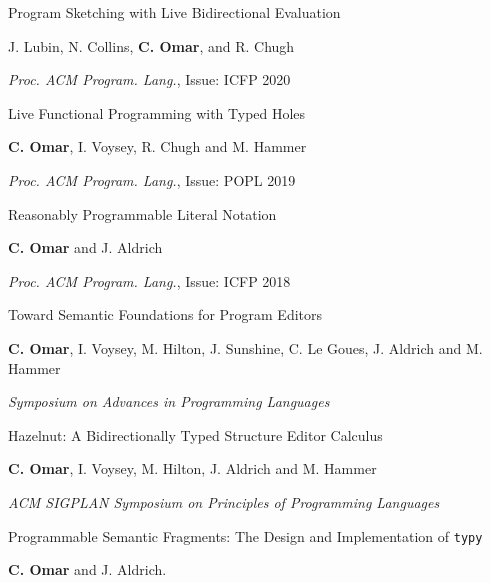 \documentclass[10pt,letterpaper]{article}
\renewenvironment{itemize}{
  \begin{list}{}{
    \setlength{\leftmargin}{1.25em}
    \setlength{\itemsep}{0.25em}
    \setlength{\parskip}{0pt}
    \setlength{\parsep}{0.2em}
  }
}{
  \end{list}
}
\begin{document}
\begin{enumerate}[leftmargin=*, labelindent=6.5em, font=\bfseries]
\begin{itemize}
        \end{itemize}
  \item[ICFP 2020] {Program Sketching with Live Bidirectional Evaluation}
        \begin{itemize}
          \item J. Lubin, N. Collins, \textbf{C. Omar}, and R. Chugh
          \item \textit{Proc. ACM Program. Lang.}, Issue: ICFP 2020
        \end{itemize}
  \item[POPL 2019] {Live Functional Programming with Typed Holes}
        \begin{itemize}
          \item \textbf{C. Omar}, I. Voysey, R. Chugh and M. Hammer
          \item \textit{Proc. ACM Program. Lang.}, Issue: POPL 2019
        \end{itemize}
  \item[ICFP 2018] {Reasonably Programmable Literal Notation}
        \begin{itemize}
          \item \textbf{C. Omar} and J. Aldrich
          \item \textit{Proc. ACM Program. Lang.}, Issue: ICFP 2018
        \end{itemize}
  \item[SNAPL 2018] Toward Semantic Foundations for Program Editors
        \begin{itemize}
          \item \textbf{C. Omar}, I. Voysey, M. Hilton, J. Sunshine, C. Le Goues, J. Aldrich and M. Hammer
          \item \textit{Symposium on Advances in Programming Languages} 
        \end{itemize}
  \item[POPL 2017] {Hazelnut: A Bidirectionally Typed Structure Editor Calculus}
        \begin{itemize}
          \item \textbf{C. Omar}, I. Voysey, M. Hilton, J. Aldrich and M. Hammer
          \item \textit{ACM SIGPLAN Symposium on Principles of Programming Languages} 
        \end{itemize}
  \item[GPCE 2016] {Programmable Semantic Fragments: The Design and Implementation of \texttt{typy}}
        \begin{itemize}
          \item \textbf{C. Omar} and J. Aldrich.

\end{itemize}
\end{enumerate}
\end{document}
